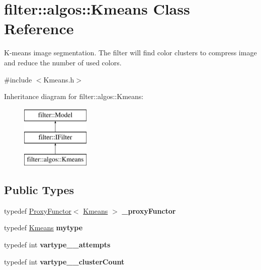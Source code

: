 \hypertarget{classfilter_1_1algos_1_1_kmeans}{}\section{filter\+:\+:algos\+:\+:Kmeans Class Reference}
\label{classfilter_1_1algos_1_1_kmeans}


K-\/means image segmentation. The filter will find color clusters to compress image and reduce the number of used colors.  




{\ttfamily \#include $<$Kmeans.\+h$>$}

Inheritance diagram for filter\+:\+:algos\+:\+:Kmeans\+:\begin{figure}[H]
\begin{center}
\leavevmode
\includegraphics[height=3.000000cm]{d4/db7/classfilter_1_1algos_1_1_kmeans}
\end{center}
\end{figure}
\subsection*{Public Types}
\begin{DoxyCompactItemize}
\item 
\mbox{\label{classfilter_1_1algos_1_1_kmeans_a5893636b3d5d7118295cf3791145a1bb}} 
typedef \hyperlink{class_proxy_functor}{Proxy\+Functor}$<$ \hyperlink{classfilter_1_1algos_1_1_kmeans}{Kmeans} $>$ {\bfseries \+\_\+proxy\+Functor}
\item 
\mbox{\label{classfilter_1_1algos_1_1_kmeans_a2af1bc3fe14fe32dafb08076f78f817d}} 
typedef \hyperlink{classfilter_1_1algos_1_1_kmeans}{Kmeans} {\bfseries mytype}
\item 
\mbox{\label{classfilter_1_1algos_1_1_kmeans_a48c6ed215fecdd89f74d3bfbc971e925}} 
typedef int {\bfseries vartype\+\_\+\+\_\+attempts}
\item 
\mbox{\label{classfilter_1_1algos_1_1_kmeans_a800268f719a10c290e58cbad5cbb7423}} 
typedef int {\bfseries vartype\+\_\+\+\_\+cluster\+Count}
\end{DoxyCompactItemize}
